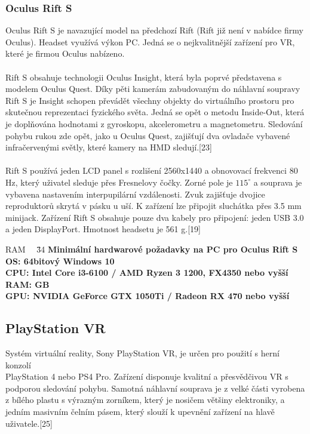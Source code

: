 \documentclass[a4paper, 12pt]{report}
\begin{document}
\subsubsection{Oculus Rift S} Oculus Rift S je navazující model na předchozí Rift (Rift již není v nabídce firmy Oculus). Headset využívá výkon PC. Jedná se o nejkvalitnější zařízení pro VR, které je firmou Oculus nabízeno.\\
\\
Rift S obsahuje technologii Oculus Insight, která byla poprvé představena s modelem Oculus Quest. Díky pěti kamerám zabudovaným do náhlavní soupravy Rift S je Insight schopen převádět všechny objekty do virtuálního prostoru pro skutečnou reprezentaci fyzického světa. Jedná se opět o metodu Inside-Out, která je doplňována hodnotami z  gyroskopu, akcelerometru a magnetometru. Sledování pohybu rukou zde opět, jako u Oculus Quest, zajišťují dva ovladače vybavené infračervenými světly, které kamery na HMD sledují.[23]\\
\\
Rift S používá jeden LCD panel s rozlišení 2560x1440 a obnovovací frekvenci 80 Hz, který uživatel sleduje přes Fresnelovy čočky. Zorné pole je $115^\circ$ a souprava je vybavena nastavením  interpupilární vzdálenosti. Zvuk zajišťuje dvojice reproduktorů skrytá v pásku u uší. K zařízení lze připojit sluchátka přes 3.5 mm minijack. Zařízení Rift S obsahuje pouze dva kabely pro připojení: jeden USB 3.0 a jeden DisplayPort. Hmotnost headsetu je 561 g.[19]\\

\begin{tabbing}
    RAM ~~\= 
    \= 34 \kill
    \bfseries Minimální hardwarové požadavky na PC pro Oculus Rift S \> \\[1mm]
    OS: \> 64bitový Windows 10\\
    CPU: \> Intel Core i3-6100 / AMD Ryzen 3 1200, FX4350 nebo vyšší\\
    RAM:  GB\\
    GPU: \> NVIDIA GeForce GTX 1050Ti / Radeon RX 470 nebo vyšší\\
    \end{tabbing}
    
\subsection{PlayStation VR}
Systém virtuální reality, Sony PlayStation VR, je určen pro použití s herní konzolí \\ PlayStation 4 nebo PS4 Pro. Zařízení disponuje kvalitní a přesvědčivou VR s podporou sledování pohybu. Samotná náhlavní souprava je z velké části vyrobena z bílého plastu s výrazným zorníkem, který je nosičem většiny elektroniky, a jedním masivním čelním pásem, který slouží k upevnění zařízení na hlavě uživatele.[25]
\end{document}
